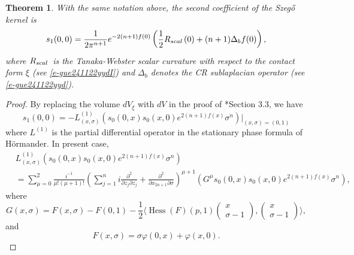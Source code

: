 \documentclass[12pt]{amsart}
\newtheorem{theorem}{Theorem}[section]
\theoremstyle{definition}
\theoremstyle{named}
\numberwithin{equation}{subsection}
\begin{document}
\begin{theorem}\label{t-gue241120yydk}
    With the same notation above, the second coefficient of the Szeg\H{o} kernel is $$s_1(0,0)=\frac{1}{2\pi^{n+1}}e^{-2(n+1)f(0)}\left(\frac{1}{2}R_{{\rm scal\,}}(0)+(n+1)\Delta_b f(0)\right),$$
    where $R_{{\rm scal\,}}$ is the Tanaka-Webster scalar curvature with respect to the contact form $\xi$ (see \eqref{e-gue241122yydI}) and $\Delta_b$ denotes the CR sublaplacian operator (see \eqref{e-gue241122yyd}). 
\end{theorem}
\begin{proof}
    By replacing the volume $dV_\xi$ with $dV$ in the proof of \cite{Hsiao_Shen_2nd_coefficient_BS_2020}*{Section 3.3}, we have 
    \begin{equation}\label{eqn:Interproof 01 szego conformal}
         s_1(0,0)=-L^{(1)}_{(x,\sigma)}(s_0(0,x)s_0(x,0)e^{2(n+1)f(x)}\sigma^n)|_{(x,\sigma)=(0,1)}
    \end{equation}
    where $L^{(1)}$ is the partial differential operator in the stationary phase formula of H\"ormander. In present case, 
    \begin{equation}\label{e-gue241207ycdm}
    \begin{split}
         & L^{(1)}_{(x,\sigma)}(s_0(0,x)s_0(x,0)e^{2(n+1)f(x)}\sigma^n)\\
         &=\sum^{2}_{\mu=0}\frac{i^{-1}}{\mu!(\mu+1)!}\left(\sum^{n}_{j=1}i\frac{\partial^2}{\partial z_j\partial\overline{z_j}}+\frac{\partial^2}{\partial x_{2n+1}\partial\sigma}\right)^{\mu+1}(G^{\mu}s_0(0,x)s_0(x,0)e^{2(n+1)f(x)}\sigma^n),
         \end{split}
    \end{equation}
where $$G(x,\sigma)=F(x,\sigma)-F(0,1)-\frac{1}{2}\Big\langle \operatorname{Hess}(F)(p,1)\begin{pmatrix}
        x\\ \sigma-1
    \end{pmatrix},\begin{pmatrix}
        x\\ \sigma-1
    \end{pmatrix}\Big\rangle,$$ and $$F(x,\sigma)=\sigma\varphi(0,x)+\varphi(x,0).$$
    

\end{proof}
\end{document}
